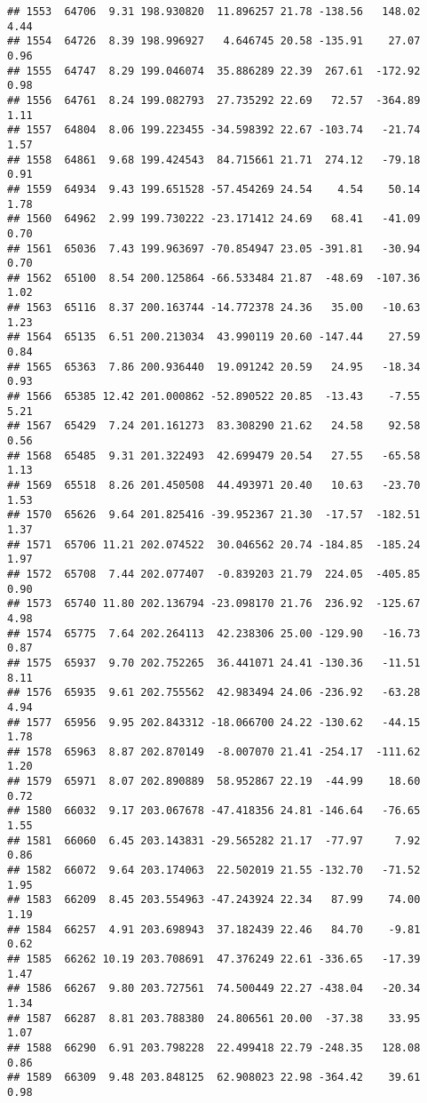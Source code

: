 \documentclass[]{article}
\begin{document}
\begin{verbatim}
## 1553  64706  9.31 198.930820  11.896257 21.78 -138.56   148.02  4.44
## 1554  64726  8.39 198.996927   4.646745 20.58 -135.91    27.07  0.96
## 1555  64747  8.29 199.046074  35.886289 22.39  267.61  -172.92  0.98
## 1556  64761  8.24 199.082793  27.735292 22.69   72.57  -364.89  1.11
## 1557  64804  8.06 199.223455 -34.598392 22.67 -103.74   -21.74  1.57
## 1558  64861  9.68 199.424543  84.715661 21.71  274.12   -79.18  0.91
## 1559  64934  9.43 199.651528 -57.454269 24.54    4.54    50.14  1.78
## 1560  64962  2.99 199.730222 -23.171412 24.69   68.41   -41.09  0.70
## 1561  65036  7.43 199.963697 -70.854947 23.05 -391.81   -30.94  0.70
## 1562  65100  8.54 200.125864 -66.533484 21.87  -48.69  -107.36  1.02
## 1563  65116  8.37 200.163744 -14.772378 24.36   35.00   -10.63  1.23
## 1564  65135  6.51 200.213034  43.990119 20.60 -147.44    27.59  0.84
## 1565  65363  7.86 200.936440  19.091242 20.59   24.95   -18.34  0.93
## 1566  65385 12.42 201.000862 -52.890522 20.85  -13.43    -7.55  5.21
## 1567  65429  7.24 201.161273  83.308290 21.62   24.58    92.58  0.56
## 1568  65485  9.31 201.322493  42.699479 20.54   27.55   -65.58  1.13
## 1569  65518  8.26 201.450508  44.493971 20.40   10.63   -23.70  1.53
## 1570  65626  9.64 201.825416 -39.952367 21.30  -17.57  -182.51  1.37
## 1571  65706 11.21 202.074522  30.046562 20.74 -184.85  -185.24  1.97
## 1572  65708  7.44 202.077407  -0.839203 21.79  224.05  -405.85  0.90
## 1573  65740 11.80 202.136794 -23.098170 21.76  236.92  -125.67  4.98
## 1574  65775  7.64 202.264113  42.238306 25.00 -129.90   -16.73  0.87
## 1575  65937  9.70 202.752265  36.441071 24.41 -130.36   -11.51  8.11
## 1576  65935  9.61 202.755562  42.983494 24.06 -236.92   -63.28  4.94
## 1577  65956  9.95 202.843312 -18.066700 24.22 -130.62   -44.15  1.78
## 1578  65963  8.87 202.870149  -8.007070 21.41 -254.17  -111.62  1.20
## 1579  65971  8.07 202.890889  58.952867 22.19  -44.99    18.60  0.72
## 1580  66032  9.17 203.067678 -47.418356 24.81 -146.64   -76.65  1.55
## 1581  66060  6.45 203.143831 -29.565282 21.17  -77.97     7.92  0.86
## 1582  66072  9.64 203.174063  22.502019 21.55 -132.70   -71.52  1.95
## 1583  66209  8.45 203.554963 -47.243924 22.34   87.99    74.00  1.19
## 1584  66257  4.91 203.698943  37.182439 22.46   84.70    -9.81  0.62
## 1585  66262 10.19 203.708691  47.376249 22.61 -336.65   -17.39  1.47
## 1586  66267  9.80 203.727561  74.500449 22.27 -438.04   -20.34  1.34
## 1587  66287  8.81 203.788380  24.806561 20.00  -37.38    33.95  1.07
## 1588  66290  6.91 203.798228  22.499418 22.79 -248.35   128.08  0.86
## 1589  66309  9.48 203.848125  62.908023 22.98 -364.42    39.61  0.98

\end{verbatim}
\end{document}
